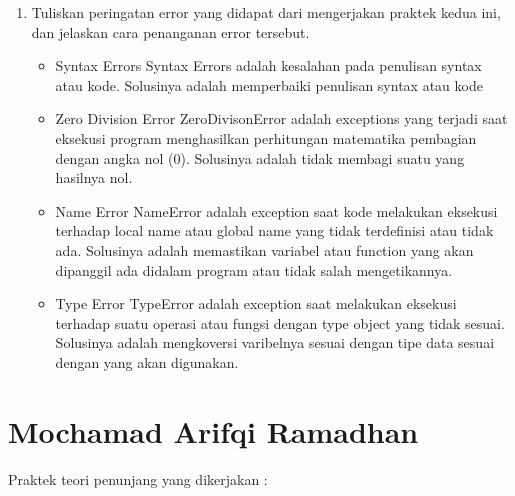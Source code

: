 \begin{enumerate}

\item Tuliskan peringatan error yang didapat dari mengerjakan praktek kedua ini, dan jelaskan cara penanganan error tersebut.
\begin{itemize}

\item Syntax Errors
Syntax Errors adalah kesalahan pada penulisan syntax atau kode. Solusinya adalah memperbaiki penulisan syntax atau kode

\item Zero Division Error
ZeroDivisonError adalah exceptions yang terjadi saat eksekusi program menghasilkan perhitungan matematika pembagian dengan angka nol (0). Solusinya adalah tidak membagi suatu yang hasilnya nol.

\item Name Error
NameError adalah exception saat kode melakukan eksekusi terhadap local name atau global name yang tidak terdefinisi atau tidak ada. Solusinya adalah memastikan variabel atau function yang akan dipanggil ada didalam program atau tidak salah mengetikannya.

\item Type Error
TypeError adalah exception saat melakukan eksekusi terhadap suatu operasi atau fungsi dengan type object yang tidak sesuai. Solusinya adalah mengkoversi varibelnya sesuai dengan tipe data sesuai dengan yang akan digunakan.
   
\end{itemize}
\end{enumerate}

\section{Mochamad Arifqi Ramadhan}
Praktek teori penunjang yang dikerjakan :
